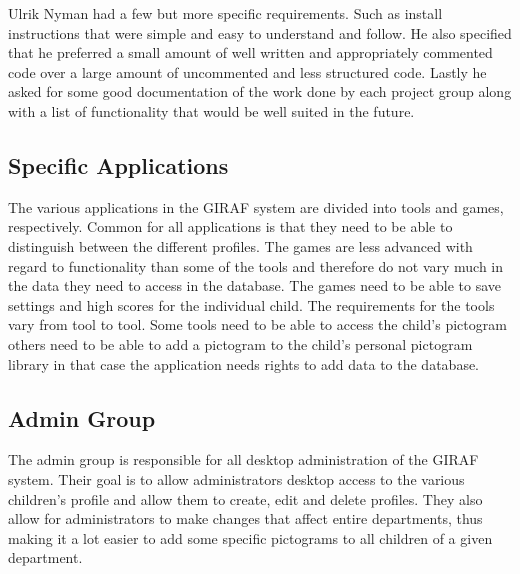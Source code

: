Ulrik Nyman had a few but more specific requirements. Such as install instructions that were simple and easy to understand and follow. He also specified that he preferred a small amount of well written and appropriately commented code over a large amount of uncommented and less structured code. Lastly he asked for some good documentation of the work done by each project group along with a list of functionality that would be well suited in the future. 



\subsection{Specific Applications} %
\label{sub:specific_applications}
The various applications in the GIRAF system are divided into tools and games, respectively. Common for all applications is that they need to be able to distinguish between the different profiles. The games are less advanced with regard to functionality than some of the tools and therefore do not vary much in the data they need to access in the database. The games need to be able to save settings and high scores for the individual child. The requirements for the tools vary from tool to tool. Some tools need to be able to access the child's pictogram others need to be able to add a pictogram to the child's personal pictogram library in that case the application needs rights to add data to the database.  

\subsection{Admin Group} %
\label{sub:admin_group}
The admin group is responsible for all desktop administration of the GIRAF system. Their goal is to allow administrators desktop access to the various children's profile and allow them to create, edit and delete profiles. They also allow for administrators to make changes that affect entire departments, thus making it a lot easier to add some specific pictograms to all children of a given department.   

